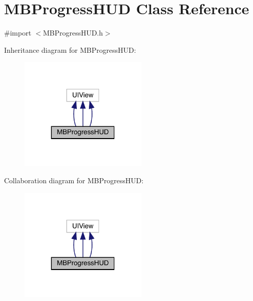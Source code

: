 \hypertarget{interface_m_b_progress_h_u_d}{}\section{M\+B\+Progress\+H\+UD Class Reference}
\label{interface_m_b_progress_h_u_d}


{\ttfamily \#import $<$M\+B\+Progress\+H\+U\+D.\+h$>$}



Inheritance diagram for M\+B\+Progress\+H\+UD\+:\nopagebreak
\begin{figure}[H]
\begin{center}
\leavevmode
\includegraphics[width=173pt]{interface_m_b_progress_h_u_d__inherit__graph}
\end{center}
\end{figure}


Collaboration diagram for M\+B\+Progress\+H\+UD\+:\nopagebreak
\begin{figure}[H]
\begin{center}
\leavevmode
\includegraphics[width=173pt]{interface_m_b_progress_h_u_d__coll__graph}
\end{center}
\end{figure}
